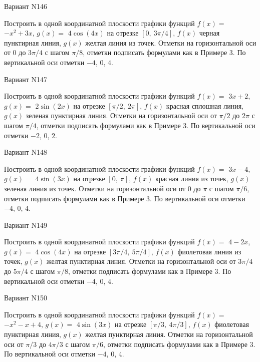 \documentclass[11pt]{report}
\begin{document}
Вариант N146

Построить в одной координатной плоскости графики функций $f(x) = $
    $- x^{2} + 3 x$, $g(x) = $
    $4 \cos{\left(4 x \right)}$ на 
    отрезке $\left[ 0, \  3 \pi / 4\right]$, $f(x)$ черная 
    пунктирная линия, $g(x)$ желтая линия из точек. 
    Отметки на горизонтальной оси от $0$ до $3 \pi / 4$ с 
    шагом $\pi / 8$, отметки подписать формулами как в Примере 3.  
    По вертикальной оси отметки $-4$, 0, $4$.

Вариант N147

Построить в одной координатной плоскости графики функций $f(x) = $
    $3 x + 2$, $g(x) = $
    $2 \sin{\left(2 x \right)}$ на 
    отрезке $\left[ \pi / 2, \  2 \pi\right]$, $f(x)$ красная 
    сплошная линия, $g(x)$ зеленая пунктирная линия. 
    Отметки на горизонтальной оси от $\pi / 2$ до $2 \pi$ с 
    шагом $\pi / 4$, отметки подписать формулами как в Примере 3.  
    По вертикальной оси отметки $-2$, 0, $2$.

Вариант N148

Построить в одной координатной плоскости графики функций $f(x) = $
    $3 x - 4$, $g(x) = $
    $4 \sin{\left(3 x \right)}$ на 
    отрезке $\left[ 0, \  \pi\right]$, $f(x)$ красная 
    линия из точек, $g(x)$ зеленая линия из точек. 
    Отметки на горизонтальной оси от $0$ до $\pi$ с 
    шагом $\pi / 6$, отметки подписать формулами как в Примере 3.  
    По вертикальной оси отметки $-4$, 0, $4$.

Вариант N149

Построить в одной координатной плоскости графики функций $f(x) = $
    $4 - 2 x$, $g(x) = $
    $4 \cos{\left(4 x \right)}$ на 
    отрезке $\left[ 3 \pi / 4, \  5 \pi / 4\right]$, $f(x)$ фиолетовая 
    линия из точек, $g(x)$ желтая пунктирная линия. 
    Отметки на горизонтальной оси от $3 \pi / 4$ до $5 \pi / 4$ с 
    шагом $\pi / 8$, отметки подписать формулами как в Примере 3.  
    По вертикальной оси отметки $-4$, 0, $4$.

Вариант N150

Построить в одной координатной плоскости графики функций $f(x) = $
    $- x^{2} - x + 4$, $g(x) = $
    $4 \sin{\left(3 x \right)}$ на 
    отрезке $\left[ \pi / 3, \  4 \pi / 3\right]$, $f(x)$ фиолетовая 
    пунктирная линия, $g(x)$ желтая пунктирная линия. 
    Отметки на горизонтальной оси от $\pi / 3$ до $4 \pi / 3$ с 
    шагом $\pi / 6$, отметки подписать формулами как в Примере 3.  
    По вертикальной оси отметки $-4$, 0, $4$.
\end{document}

